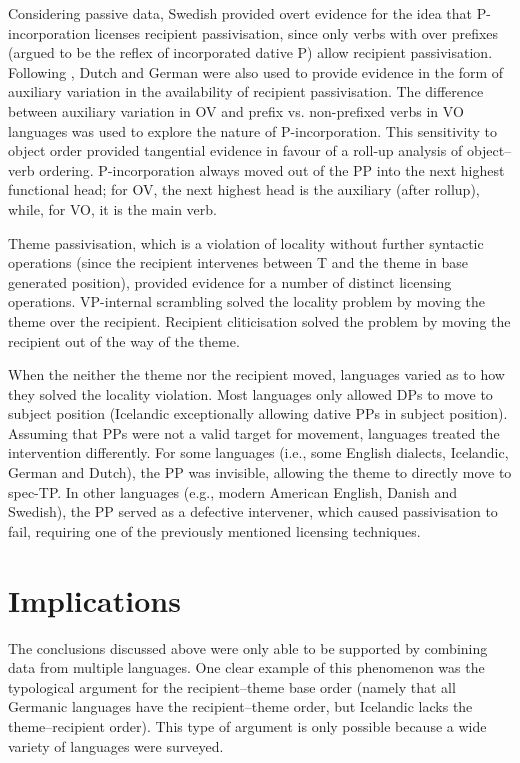 Considering passive data, Swedish provided overt evidence for the idea that P-incorporation licenses recipient passivisation, since only verbs with over prefixes (argued to be the reflex of incorporated dative P) allow recipient passivisation. Following \cite{Alexiadou.2014}, Dutch and German were also used to provide evidence in the form of auxiliary variation in the availability of recipient passivisation. The difference between auxiliary variation in OV and prefix vs. non-prefixed verbs in VO languages was used to explore the nature of P-incorporation. This sensitivity to object order provided tangential evidence in favour of a roll-up analysis of object--verb ordering. P-incorporation always moved out of the PP into the next highest functional head; for OV, the next highest head is the auxiliary (after rollup), while, for VO, it is the main verb.

Theme passivisation, which is a violation of locality without further syntactic operations (since the recipient intervenes between T and the theme in base generated position), provided evidence for a number of distinct licensing operations. VP-internal scrambling solved the locality problem by moving the theme over the recipient. Recipient cliticisation solved the problem by moving the recipient out of the way of the theme.

When the neither the theme nor the recipient moved, languages varied as to how they solved the locality violation. Most languages only allowed DPs to move to subject position (Icelandic exceptionally allowing dative PPs in subject position). Assuming that PPs were not a valid target for movement, languages treated the intervention differently. For some languages (i.e., some English dialects, Icelandic, German and Dutch), the PP was invisible, allowing the theme to directly move to spec-TP. In other languages (e.g., modern American English, Danish and Swedish), the PP served as a defective intervener, which caused passivisation to fail, requiring one of the previously mentioned licensing techniques.

\section{Implications}
The conclusions discussed above were only able to be supported by combining data from multiple languages. One clear example of this phenomenon was the typological argument for the recipient--theme base order (namely that all Germanic languages have the recipient--theme order, but Icelandic lacks the theme--recipient order). This type of argument is only possible because a wide variety of languages were surveyed.

